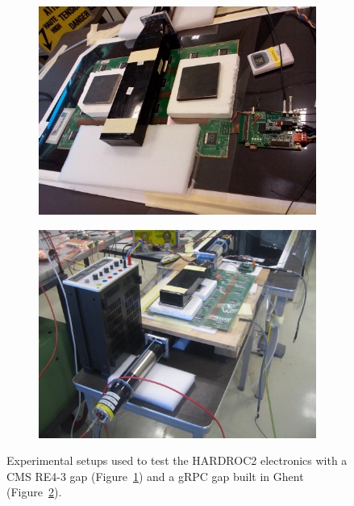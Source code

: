 	\begin{figure}[H]
		\begin{subfigure}{.5\linewidth}
		    \centering
			\includegraphics[width = \linewidth]{fig/chapt6/Setup_HARDROC_PAK.jpg}
			\caption{\label{fig:Setup-HARDROC2:A}}
		\end{subfigure}
		\begin{subfigure}{.5\linewidth}
		    \centering
			\includegraphics[width = \linewidth]{fig/chapt6/Setup_HARDROC_gRPC.JPG}
			\caption{\label{fig:Setup-HARDROC2:B}}
		\end{subfigure}
		\caption{\label{fig:Setup-HARDROC2} Experimental setups used to test the HARDROC2 electronics with a CMS RE4-3 gap (Figure~\ref{fig:Setup-HARDROC2:A}) and a gRPC gap built in Ghent (Figure~\ref{fig:Setup-HARDROC2:B}).}
    \end{figure}
	 
